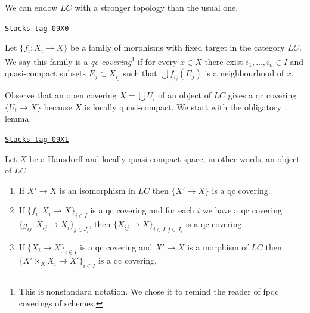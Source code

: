 We can endow $\textit{LC}$ with a stronger topology than the usual one.

\begin{definition}[Covering LC]
\label{sites-cohomology-definition-covering-LC}
\href{https://stacks.math.columbia.edu/tag/09X0}{\texttt{Stacks tag 09X0}}

Let $\{f_i : X_i \to X\}$ be a family of morphisms with fixed target
in the category $\textit{LC}$. We say this family is a
{\it qc covering}\footnote{This is nonstandard notation.
We chose it to remind the reader of fpqc coverings of schemes.}
if for every $x \in X$ there exist $i_1, \ldots, i_n \in I$ and
quasi-compact subsets $E_j \subset X_{i_j}$ such that
$\bigcup f_{i_j}(E_j)$ is a neighbourhood of $x$.
\end{definition}

Observe that an open covering $X = \bigcup U_i$ of an object of $\textit{LC}$
gives a qc covering $\{U_i \to X\}$ because $X$ is locally quasi-compact.
We start with the obligatory lemma.

\begin{lemma}[Qc]
\label{sites-cohomology-lemma-qc}
\href{https://stacks.math.columbia.edu/tag/09X1}{\texttt{Stacks tag 09X1}}

Let $X$ be a Hausdorff and locally quasi-compact space, in other words,
an object of $\textit{LC}$.
\begin{enumerate}
\item If $X' \to X$ is an isomorphism in $\textit{LC}$ then
$\{X' \to X\}$ is a qc covering.
\item If $\{f_i : X_i \to X\}_{i\in I}$ is a qc covering and for each
$i$ we have a qc covering $\{g_{ij} : X_{ij} \to X_i\}_{j\in J_i}$, then
$\{X_{ij} \to X\}_{i \in I, j\in J_i}$ is a qc covering.
\item If $\{X_i \to X\}_{i\in I}$ is a qc covering
and $X' \to X$ is a morphism of $\textit{LC}$ then
$\{X' \times_X X_i \to X'\}_{i\in I}$ is a qc covering.
\end{enumerate}
\end{lemma}

